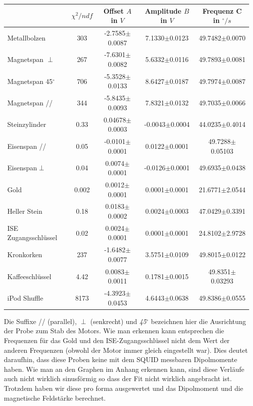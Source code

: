 \begin{center}
\begin{tabular}[H]{| l | c | c | c | c |} \hline 
 & $\chi^2 / ndf$ & Offset $A$ in $V$ & Amplitude $B$ in $V$ & Frequenz C in $^\circ/s$\\ 
\hline \hline
{Metallbolzen} & 303 & -2.7585$\pm$0.0087 & 7.1330$\pm$0.0123 &	 49.7482$\pm$0.0070\\
{Magnetspan $\perp$} & 267 & -7.6301$\pm$0.0082 & 5.6332$\pm$0.0116 & 49.7893$\pm$0.0081\\
{Magnetspan 45$^\circ$} & 706 & -5.3528$\pm$0.0133 & 8.6427$\pm$0.0187 & 49.7974$\pm$0.0087\\
{Magnetspan //} & 344 & -5.8435$\pm$0.0093 & 7.8321$\pm$0.0132 & 49.7035$\pm$0.0066\\
{Steinzylinder} & 0.33 & 0.04678$\pm$0.0003 & -0.0043$\pm$0.0004 & 44.0235$\pm$0.4014\\
{Eisenspan //} & 0.05 & -0.0101$\pm$0.0001 & 0.0122$\pm$0.0001 & 49.7288$\pm$0.05103\\
{Eisenspan$\perp$} & 0.04 & 0.0074$\pm$0.0001 & -0.0126$\pm$0.0001 & 49.6935$\pm$0.0438\\
{Gold} & 0.002 & 0.0012$\pm$0.0001 & 0.0001$\pm$0.0001 & 21.6771$\pm$2.0544\\ %
{Heller Stein} & 0.18 & 0.0183$\pm$0.0002 & 0.0024$\pm$0.0003 & 47.0429$\pm$0.3391\\
{ISE Zugangsschlüssel} & 0.02 & 0.0024$\pm$0.0001 & 0.0001$\pm$0.0001 & 24.8102$\pm$2.9728\\
{Kronkorken} & 237 & -1.6482$\pm$0.0077 & 3.5751$\pm$0.0109 & 49.8015$\pm$0.0122\\ %
{Kaffeeschlüssel} & 4.42 & 0.0083$\pm$0.0011 & 0.1781$\pm$0.0015 & 49.8351$\pm$0.03293\\
{iPod Shuffle} & 8173 & -4.3923$\pm$0.0453 & 4.6443$\pm$0.0638 & 49.8386$\pm$0.0555\\
\hline
\end{tabular}
\end{center}

Die Suffixe // (parallel), $\perp$ (senkrecht) und \emph{45$^\circ$} bezeichnen hier die Ausrichtung der Probe zum Stab des Motors. Wie man erkennen kann entsprechen die Frequenzen für das Gold und den ISE-Zugangsschlüssel nicht dem Wert der anderen Frequenzen (obwohl der Motor immer gleich eingestellt war). Dies deutet daraufhin, dass diese Proben keine mit dem SQUID messbaren Dipolmomente haben. Wie man an den Graphen im Anhang erkennen kann, sind diese Verläufe auch nicht wirklich sinusförmig so dass der Fit nicht wirklich angebracht ist. Trotzdem haben wir diese pro forma ausgewertet und das Dipolmoment und die magnetische Feldstärke berechnet.

